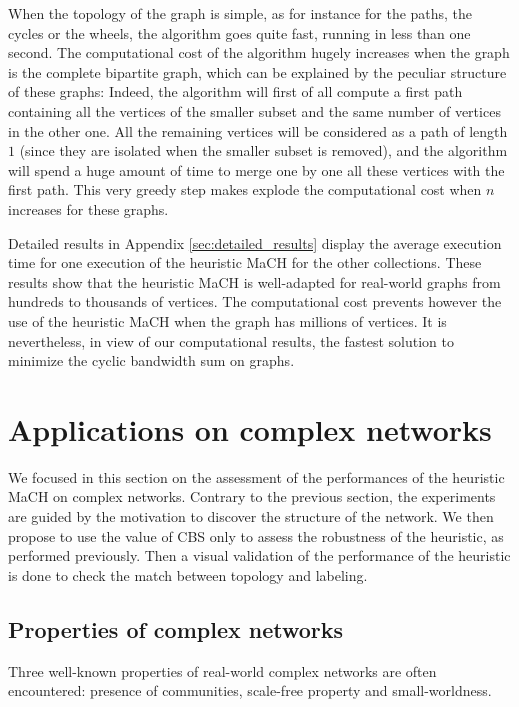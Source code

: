 \documentclass{scrartcl}
\theoremstyle{plain}
\newcommand{\algo}{MaCH}
\newcommand{\cbs}{CBS}
\begin{document}
When the topology of the graph is simple, as for instance for the paths, the 
cycles or the wheels, the algorithm goes quite fast, running in less than one 
second. The computational cost of the algorithm hugely increases when the graph 
is the complete bipartite graph, which can be explained by the peculiar 
structure of these graphs: Indeed, the algorithm will first of all compute a 
first path containing all the vertices of the smaller subset and the same number 
of vertices in the other one. All the remaining vertices will be considered as a 
path of length $1$ (since they are isolated when the smaller subset is removed), 
and the algorithm will spend a huge amount of time to merge one by one all these 
vertices with the first path. This very greedy step makes explode the 
computational cost when $n$ increases for these graphs. 

Detailed results in Appendix \ref{sec:detailed_results} display the average 
execution time for one execution of the heuristic \algo{} for the other 
collections. These results show that the heuristic \algo{} is well-adapted for 
real-world graphs from hundreds to thousands of vertices. The computational cost 
prevents however the use of the heuristic \algo{} when the graph has millions of 
vertices. It is nevertheless, in view of our computational results, the fastest 
solution to minimize the cyclic bandwidth sum on graphs. 
\makeatletter{}\section{Applications on complex networks}
\label{sec:complex}

We focused in this section on the assessment of the performances of the 
heuristic \algo{} on complex networks. Contrary to the previous section, the 
experiments are guided by the motivation to discover the structure of the 
network.  We then propose to use the value of \cbs{} only to assess the 
robustness of the heuristic, as performed previously. Then a visual validation 
of the performance of the heuristic is done to check the match between topology 
and labeling.

\subsection{Properties of complex networks}

Three well-known properties of real-world complex networks are often 
encountered: presence of communities, scale-free property and 
small-worldness.  
\end{document}
